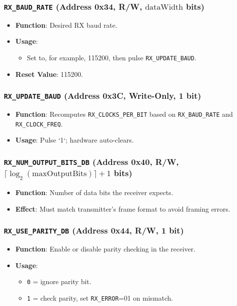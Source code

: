 \subsubsection{\texttt{RX\_BAUD\_RATE} (Address 0x34, R/W, \(\text{dataWidth}\) bits)}
\begin{itemize}[noitemsep]
\item \textbf{Function}: Desired RX baud rate.
\item \textbf{Usage}: 
  \begin{itemize}[noitemsep]
  \item Set to, for example, 115200, then pulse \texttt{RX\_UPDATE\_BAUD}.
  \end{itemize}
\item \textbf{Reset Value}: 115200.
\end{itemize}

\subsubsection{\texttt{RX\_UPDATE\_BAUD} (Address 0x3C, Write-Only, 1 bit)}
\begin{itemize}[noitemsep]
\item \textbf{Function}: Recomputes \texttt{RX\_CLOCKS\_PER\_BIT} based on \texttt{RX\_BAUD\_RATE} and \texttt{RX\_CLOCK\_FREQ}.
\item \textbf{Usage}: Pulse `1`; hardware auto-clears.
\end{itemize}

\subsubsection{\texttt{RX\_NUM\_OUTPUT\_BITS\_DB} (Address 0x40, R/W, \(\lceil\log_2(\text{maxOutputBits})\rceil +1\) bits)}
\begin{itemize}[noitemsep]
\item \textbf{Function}: Number of data bits the receiver expects.
\item \textbf{Effect}: Must match transmitter's frame format to avoid framing errors.
\end{itemize}

\subsubsection{\texttt{RX\_USE\_PARITY\_DB} (Address 0x44, R/W, 1 bit)}
\begin{itemize}[noitemsep]
\item \textbf{Function}: Enable or disable parity checking in the receiver.
\item \textbf{Usage}:
  \begin{itemize}[noitemsep]
  \item \texttt{0} = ignore parity bit.
  \item \texttt{1} = check parity, set \texttt{RX\_ERROR}=01 on mismatch.
  \end{itemize}
\end{itemize}

